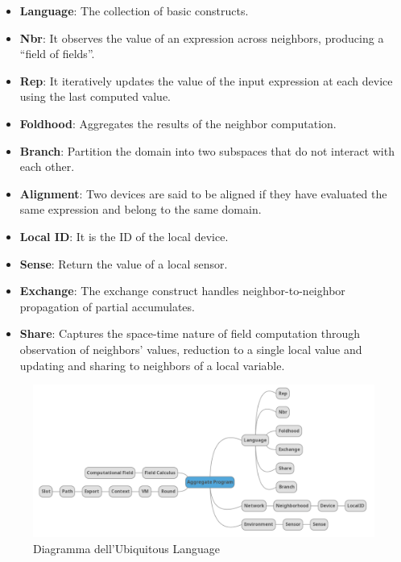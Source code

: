 \begin{itemize}
    \item \textbf{Language}: The collection of basic constructs.
    \item \textbf{Nbr}: It observes the value of an expression across neighbors, producing a “field of fields”.
    \item \textbf{Rep}: It iteratively updates the value of the input expression at each device using the last computed value.
    \item \textbf{Foldhood}: Aggregates the results of the neighbor computation.
    \item \textbf{Branch}: Partition the domain into two subspaces that do not interact with each other.
    \item \textbf{Alignment}: Two devices are said to be aligned if they have evaluated the same expression and belong to the same domain.
    \item \textbf{Local ID}: It is the ID of the local device.
    \item \textbf{Sense}: Return the value of a local sensor.
    \item \textbf{Exchange}: The exchange construct handles neighbor-to-neighbor propagation of partial accumulates.
    \item \textbf{Share}: Captures the space-time nature of field computation through observation of neighbors’ values, reduction to a single local value and updating and sharing to neighbors of a local variable.
\end{itemize}

\begin{figure}[ht]
    \centering %
    \includegraphics[width=1\linewidth]{images/ul.png}
    \caption{Diagramma dell'Ubiquitous Language}
    \label{fig:ul}
\end{figure}